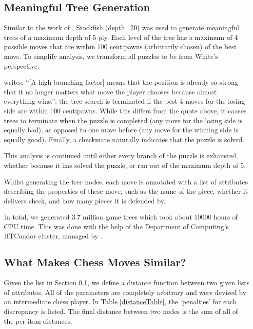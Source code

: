\subsection{Meaningful Tree Generation}\label{treeS12}

Similar to the work of \citet{chessTrees}, Stockfish (depth=20) was used to
generate meaningful trees of a maximum depth of 5 ply. Each level of the tree
has a maximum of 4 possible moves that are within 100 centipawns (arbitrarily
chosen) of the best move. To simplify analysis, we transform all puzzles to be
from White's perspective.

\citet{chessTrees} writes: ``[A high branching factor] means that the position
is already so strong that it no longer matters what move the player chooses
because almost everything wins.''; the tree search is terminated if the best 4
moves for the losing side are within 100 centipawns. While this differs from
the quote above, it causes trees to terminate when the puzzle is completed (any
move for the losing side is equally bad), as opposed to one move before (any
move for the winning side is equally good). Finally, a checkmate naturally
indicates that the puzzle is solved. 

This analysis is continued until either every branch of the puzzle is
exhausted, whether because it has solved the puzzle, or ran out of the maximum
depth of 5.

Whilst generating the tree nodes, each move is annotated with a list of
attributes describing the properties of these move, such as the name of the
piece, whether it delivers check, and how many pieces it is defended by.

In total, we generated 3.7 million game trees which took about 10000 hours of
CPU time. This was done with the help of the Department of Computing's HTCondor
cluster, managed by \citet{csgCondor}.

\subsection{What Makes Chess Moves Similar?}\label{treeS13}

Given the list in Section \ref{treeS12}, we define a distance function
between two given lists of attributes. All of the parameters are completely
arbitrary and were devised by an intermediate chess player. In Table
\ref{distanceTable}, the `penalties' for each discrepancy is listed. The final
distance between two nodes is the sum of all of the per-item distances.

